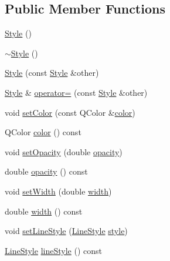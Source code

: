 \subsection*{Public Member Functions}
\begin{DoxyCompactItemize}
\item 
\hyperlink{classOkular_1_1Annotation_1_1Style_afdbcc6b5e72bc0c2cf4f1615cd054864}{Style} ()
\item 
\hyperlink{classOkular_1_1Annotation_1_1Style_a3b7a663aea58f2edd5c5b629468a6c44}{$\sim$\+Style} ()
\item 
\hyperlink{classOkular_1_1Annotation_1_1Style_a61202381e3fb519a76784aaac5c1c1f5}{Style} (const \hyperlink{classOkular_1_1Annotation_1_1Style}{Style} \&other)
\item 
\hyperlink{classOkular_1_1Annotation_1_1Style}{Style} \& \hyperlink{classOkular_1_1Annotation_1_1Style_a12e0d9632e047acced1bf104b30ce952}{operator=} (const \hyperlink{classOkular_1_1Annotation_1_1Style}{Style} \&other)
\item 
void \hyperlink{classOkular_1_1Annotation_1_1Style_a1c916cd50a0a4114188136d47943ef00}{set\+Color} (const Q\+Color \&\hyperlink{classOkular_1_1Annotation_1_1Style_a2c32cb2b41ef8732ddcd3d3dffc20b7d}{color})
\item 
Q\+Color \hyperlink{classOkular_1_1Annotation_1_1Style_a2c32cb2b41ef8732ddcd3d3dffc20b7d}{color} () const 
\item 
void \hyperlink{classOkular_1_1Annotation_1_1Style_a5bf0bdd3bf954271ed4ba831316a7ee7}{set\+Opacity} (double \hyperlink{classOkular_1_1Annotation_1_1Style_abb17b057d91f128793b3fa3d4b556a45}{opacity})
\item 
double \hyperlink{classOkular_1_1Annotation_1_1Style_abb17b057d91f128793b3fa3d4b556a45}{opacity} () const 
\item 
void \hyperlink{classOkular_1_1Annotation_1_1Style_af0643b15b59d282c196f0c6114493d9e}{set\+Width} (double \hyperlink{classOkular_1_1Annotation_1_1Style_a5a8e23f3a4f95e25f45770937dc82948}{width})
\item 
double \hyperlink{classOkular_1_1Annotation_1_1Style_a5a8e23f3a4f95e25f45770937dc82948}{width} () const 
\item 
void \hyperlink{classOkular_1_1Annotation_1_1Style_a67fc411e13a546c16661f618979d7afc}{set\+Line\+Style} (\hyperlink{classOkular_1_1Annotation_ac60f5de2d449043f9f849f3f081f8a7a}{Line\+Style} \hyperlink{classOkular_1_1Annotation_ae1f845ddbd6d524b2b388c6c9ef26423}{style})
\item 
\hyperlink{classOkular_1_1Annotation_ac60f5de2d449043f9f849f3f081f8a7a}{Line\+Style} \hyperlink{classOkular_1_1Annotation_1_1Style_a7816f550453eceb7f50248af4ed6ae99}{line\+Style} () const 

\end{DoxyCompactItemize}
